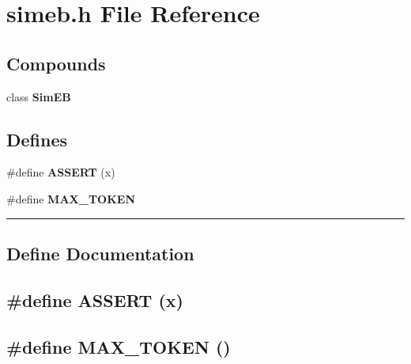 \section{simeb.h File Reference}
\label{simeb.h}


\subsection*{Compounds}
\begin{CompactItemize}
\item 
class {\bf Sim\-EB}
\end{CompactItemize}
\subsection*{Defines}
\begin{CompactItemize}
\item 
\#define {\bf ASSERT} (x) 
\item 
\#define {\bf MAX\_\-TOKEN}
\end{CompactItemize}
\vspace{0.4cm}\hrule\vspace{0.2cm}
\subsection*{Define Documentation}
\label{simeb.h_a0}
\subsection{\setlength{\rightskip}{0pt plus 5cm}\#define ASSERT (x)}

\label{simeb.h_a1}
\subsection{\setlength{\rightskip}{0pt plus 5cm}\#define MAX\_\-TOKEN ()}

